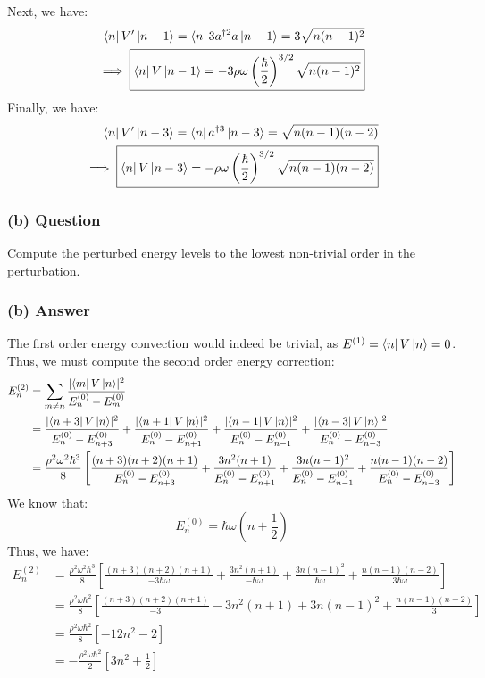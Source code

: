 \documentclass{article}
\begin{document}
Next, we have:
\begin{align}
    \bra{n}V'\ket{n-1} = \bra{n}3a^{\dagger 2}a\ket{n-1} = 3\sqrt{n(n-1)^2} \\ \implies \boxed{\bra{n}V\ket{n-1} = -3\rho \omega \left(\frac{\hbar}{2}\right)^{3/2} \sqrt{n(n-1)^2}} \\
\end{align}
Finally, we have:
\begin{align}
    \bra{n}V'\ket{n-3} = \bra{n}a^{\dagger 3}\ket{n-3} = \sqrt{n(n-1)(n-2)} \\ \implies \boxed{\bra{n}V\ket{n-3} = -\rho \omega \left(\frac{\hbar}{2}\right)^{3/2} \sqrt{n(n-1)(n-2)}} \\
\end{align}
\subsubsection*{(b) Question}
Compute the perturbed energy levels to the lowest non-trivial order in the perturbation.

\subsubsection*{(b) Answer}
The first order energy convection would indeed be trivial, as $E^{(1)} = \bra{n}V\ket{n} = 0$. Thus, we must compute the second order energy correction:
\begin{align}
    E^{(2)}_n &= \sum_{m \neq n} \frac{\lvert \bra{m}V\ket{n} \rvert^2}{E_n^{(0)} - E_m^{(0)}} \\
    &= \frac{\lvert \bra{n+3}V\ket{n} \rvert^2}{E_n^{(0)} - E_{n+3}^{(0)}} + \frac{\lvert \bra{n+1}V\ket{n} \rvert^2}{E_n^{(0)} - E_{n+1}^{(0)}} + \frac{\lvert \bra{n-1}V\ket{n} \rvert^2}{E_n^{(0)} - E_{n-1}^{(0)}} + \frac{\lvert \bra{n-3}V\ket{n} \rvert^2}{E_n^{(0)} - E_{n-3}^{(0)}} \\
    &= \frac{\rho^2 \omega^2 \hbar^3}{8} \left[ \frac{(n+3)(n+2)(n+1)}{E_n^{(0)} - E_{n+3}^{(0)}} + \frac{3n^2(n+1)}{E_n^{(0)} - E_{n+1}^{(0)}} + \frac{3n(n-1)^2}{E_n^{(0)} - E_{n-1}^{(0)}} + \frac{n(n-1)(n-2)}{E_n^{(0)} - E_{n-3}^{(0)}} \right] \\
\end{align}
We know that:
\begin{equation}
    E_n^{(0)} = \hbar \omega \left( n + \frac{1}{2} \right)
\end{equation}
Thus, we have:
\begin{align}
    E^{(2)}_n &= \frac{\rho^2 \omega^2 \hbar^3}{8} \left[ \frac{(n+3)(n+2)(n+1)}{-3\hbar \omega} + \frac{3n^2(n+1)}{-\hbar \omega} + \frac{3n(n-1)^2}{\hbar \omega} + \frac{n(n-1)(n-2)}{3\hbar \omega} \right] \\
    &= \frac{\rho^2 \omega \hbar^2}{8} \left[ \frac{(n+3)(n+2)(n+1)}{-3} - 3n^2(n+1) + 3n(n-1)^2 + \frac{n(n-1)(n-2)}{3} \right] \\
    &= \frac{\rho ^2 \omega \hbar^2}{8}\left[ -12n^2 -2\right]\\
    &= \boxed{-\frac{\rho ^2 \omega \hbar^2}{2}\left[ 3n^2 + \frac{1}{2}\right]}
\end{align}
\end{document}
